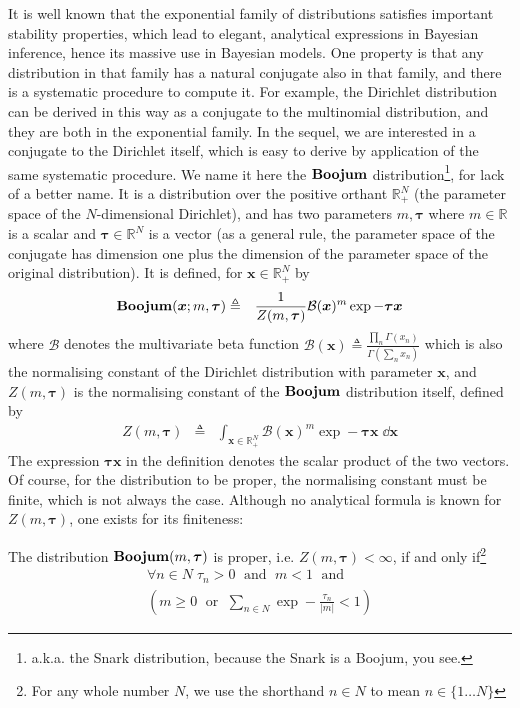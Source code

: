 It is well known that the exponential family of distributions satisfies important stability properties, which lead to elegant, analytical expressions in Bayesian inference, hence its massive use in Bayesian models. One property is that any distribution in that family has a natural conjugate also in that family, and there is a systematic procedure to compute it. For example, the Dirichlet distribution can be derived in this way as a conjugate to the multinomial distribution, and they are both in the exponential family. In the sequel, we are interested in a conjugate to the Dirichlet itself, which is easy to derive by application of the same systematic procedure. We name it here the $\mathbf{Boojum}$ distribution\footnote{a.k.a. the Snark distribution, because the Snark is a Boojum, you see.}, for lack of a better name. It is a distribution over the positive orthant $\mathbb{R}_+^N$ (the parameter space of the $N$-dimensional Dirichlet), and has two parameters $m,\boldsymbol{\tau}$ where $m\in\mathbb{R}$ is a scalar and $\boldsymbol{\tau}\in\mathbb{R}^N$ is a vector (as a general rule, the parameter space of the conjugate has dimension one plus the dimension of the parameter space of the original distribution). It is defined, for $\boldsymbol{x}\in\mathbb{R}_+^N$ by
\begin{eqnarray*}
\mathbf{Boojum}(\boldsymbol{x};m,\boldsymbol{\tau}) & \triangleq & \frac{1}{Z(m,\boldsymbol{\tau})}\mathcal{B}(\boldsymbol{x})^m\exp-\boldsymbol{\tau}\boldsymbol{x}
\end{eqnarray*}
where $\mathcal{B}$ denotes the multivariate beta function $\mathcal{B}(\boldsymbol{x})\triangleq\frac{\prod_n\Gamma(x_n)}{\Gamma(\sum_nx_n)}$ which is also the normalising constant of the Dirichlet distribution with parameter $\boldsymbol{x}$, and $Z(m,\boldsymbol{\tau})$ is the normalising constant of the $\mathbf{Boojum}$ distribution itself, defined by
\begin{eqnarray*}
Z(m,\boldsymbol{\tau}) & \triangleq & \int_{\boldsymbol{x}\in\mathbb{R}_+^N}\mathcal{B}(\boldsymbol{x})^m\exp-\boldsymbol{\tau} \boldsymbol{x}\;\dd{\boldsymbol{x}}
\end{eqnarray*}
The expression $\boldsymbol{\tau} \boldsymbol{x}$ in the definition denotes the scalar product of the two vectors. Of course, for the distribution to be proper, the normalising constant must be finite, which is not always the case. Although no analytical formula is known for $Z(m,\boldsymbol{\tau})$, one exists for its finiteness:
\begin{proposition}
\label{prop:mbeta-proper}
The distribution $\mathbf{Boojum}(m,\boldsymbol{\tau})$ is proper, i.e. $Z(m,\boldsymbol{\tau})<\infty$, if and only if\footnote{For any whole number $N$, we use the shorthand $n\in N$ to mean $n\in\{1\ldots N\}$}
\[
\begin{array}{l}
\forall n\in N\;\tau_n>0 \;\textrm{ and }\; m<1 \;\textrm{ and }\\
(m\geq0 \;\textrm{ or }\; \sum_{n\in N}\exp-\frac{\tau_n}{|m|}<1)
\end{array}
\]
\end{proposition}
